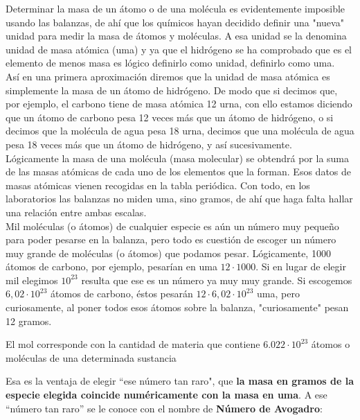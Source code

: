 Determinar la masa de un átomo o de una molécula es evidentemente imposible usando las balanzas, de ahí que los químicos hayan decidido definir una "nueva" unidad para medir la masa de átomos y moléculas. A esa unidad se la denomina unidad de masa atómica (uma) y ya que el hidrógeno se ha comprobado que es el elemento de menos masa es lógico definirlo como unidad, definirlo como uma.\\

Así en una primera aproximación diremos que la unidad de masa atómica es simplemente la masa de un átomo de hidrógeno. De modo que si decimos que, por ejemplo, el carbono tiene de masa atómica 12 urna, con ello estamos diciendo que un átomo de carbono pesa 12 veces más que un átomo de hidrógeno, o si decimos que la molécula de agua pesa 18 urna, decimos que una molécula de agua pesa 18 veces más que un átomo de hidrógeno, y así sucesivamente.\\

Lógicamente la masa de una molécula (masa molecular) se obtendrá por la suma de las masas atómicas de cada uno de los elementos que la forman. Esos datos de masas atómicas vienen recogidas en la tabla periódica. Con todo, en los laboratorios las balanzas no miden uma, sino gramos, de ahí que haga falta hallar una relación entre ambas escalas.\\


Mil moléculas (o átomos) de cualquier especie es aún un número muy pequeño para poder pesarse en la balanza, pero todo es cuestión de escoger un número muy grande de moléculas (o átomos) que podamos pesar. Lógicamente, 1000 átomos de carbono, por ejemplo, pesarían en uma $12\cdot 1000$. Si en lugar de elegir mil elegimos $10^{23}$ resulta que ese es un número ya muy muy grande. Si escogemos $6,02\cdot10^{23}$ átomos de carbono, éstos pesarán $12\cdot6,02\cdot10^23$ uma, pero curiosamente, al poner todos esos átomos sobre la balanza, "curiosamente" pesan 12 gramos.\\

\begin{definition}[Mol]
	El mol corresponde con la cantidad de materia que contiene $6.022\cdot10^{23}$ átomos o moléculas de una determinada sustancia
\end{definition}

Esa es la ventaja de elegir “ese número tan raro", que \textbf{la masa en gramos de la especie elegida coincide numéricamente con la masa en uma}. A ese “número tan raro” se le conoce con el nombre de \textbf{Número de Avogadro}:\\


